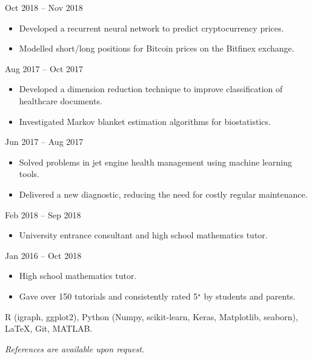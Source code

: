 \documentclass[
  date,
  number,
]{wgu-cv}
\begin{document}

{}
{Oct 2018 -- Nov 2018}

\begin{itemize}
	\item Developed a recurrent neural network to predict cryptocurrency prices.
	\item Modelled short/long positions for Bitcoin prices on the Bitfinex exchange.
\end{itemize}


{}
{Aug 2017 -- Oct 2017}

\begin{itemize}
	\item Developed a dimension reduction technique to
    improve classification of healthcare documents.
	\item Investigated Markov blanket estimation algorithms for biostatistics.
\end{itemize}


{}
{Jun 2017 -- Aug 2017}

\begin{itemize}
	\item Solved problems in jet engine health management using machine learning tools.
	\item Delivered a new diagnostic, reducing the need for costly regular maintenance.
\end{itemize}



{}
{Feb 2018 -- Sep 2018}

\begin{itemize}
	\item University entrance consultant and high school mathematics tutor.
\end{itemize}


{}
{Jan 2016 -- Oct 2018}

\begin{itemize}
	\item High school mathematics tutor.
	\item Gave over 150 tutorials and consistently rated 5$^\star$ by students and parents.
\end{itemize}



R (igraph, ggplot2),
Python (Numpy, scikit-learn, Keras, Matplotlib, seaborn),
LaTeX,
Git,
MATLAB.



\emph{References are available upon request.}



\nobibliography*
\end{document}
